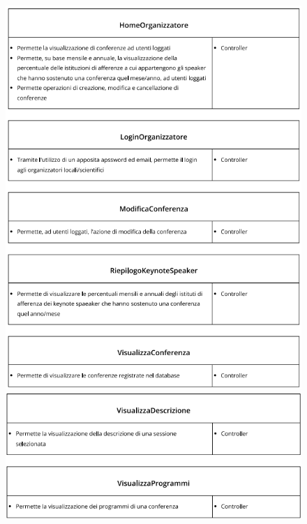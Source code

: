 \documentclass[a4paper,italian,10pt,openany]{book}
\begin{document}
\begin{figure}[h!]
\centering
\includegraphics[width=13cm]{crc_card_gui2}
\includegraphics[width=13cm]{crc_card_gui3}
\end{figure}
\end{document}
